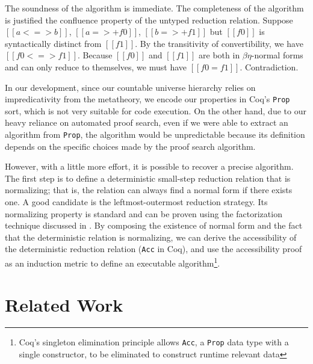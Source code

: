 \documentclass[acmsmall,screen=true,
\ifpublic review=false\else,review=true\fi
  ,anonymous=\ifanonymous true\else false\fi]{acmart}
\begin{document}
The soundness of the algorithm is immediate. The completeness of the
algorithm is justified the confluence property of the untyped
reduction relation. Suppose $[[a <=> b]]$, $[[a =>+ f0]]$, $[[b =>+
f1]]$ but $[[f0]]$ is syntactically distinct from $[[f1]]$. By the transitivity of convertibility, we have $[[f0 <=> f1]]$.
Because $[[f0]]$ and $[[f1]]$ are both in
$\beta\eta$-normal forms and can only reduce to themselves, we must
have $[[f0 = f1]]$. Contradiction.

In our development, since our countable universe hierarchy
relies on impredicativity from the metatheory, we encode our
properties in Coq's \texttt{Prop} sort, which is not very suitable for
code execution. On the other hand, due to our heavy reliance on
automated proof search, even if we were able to extract an algorithm from \texttt{Prop},
the algorithm would be unpredictable because its definition depends on
the specific choices made by the proof search algorithm.

However, with a little more effort, it is possible to recover a
precise algorithm. The first step is to define a deterministic
small-step reduction relation that is normalizing; that is, the
relation can always find a normal form if there exists one. A good
candidate is the leftmost-outermost reduction strategy. Its
normalizing property is standard and can be proven using the
factorization technique discussed in
\citet{takahashi-parallel-reduction, factorization-essentially}. By
composing the existence of normal form and the fact that the
deterministic relation is normalizing, we can derive the
accessibility of the deterministic reduction relation
(\texttt{Acc} in Coq), and use the accessibility proof as
an induction metric to define an executable algorithm\footnote{Coq's
  singleton elimination principle allows \texttt{Acc}, a
  \texttt{Prop} data type with a single constructor, to be eliminated
  to construct runtime relevant data}.

\section{Related Work}
\label{sec:relatedwork}

\def\rot{\rotatebox}
\newcommand\header[1]{\rotatebox{90}{{#1}}}
\end{document}
